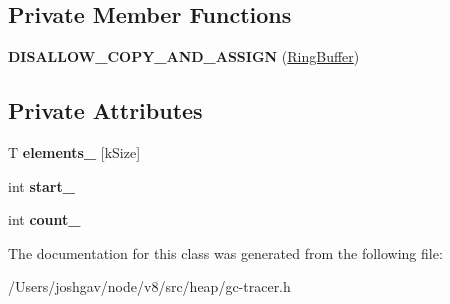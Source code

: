 \subsection*{Private Member Functions}
\begin{DoxyCompactItemize}
\item 
{\bfseries D\+I\+S\+A\+L\+L\+O\+W\+\_\+\+C\+O\+P\+Y\+\_\+\+A\+N\+D\+\_\+\+A\+S\+S\+I\+GN} (\hyperlink{classv8_1_1internal_1_1_ring_buffer}{Ring\+Buffer})\hypertarget{classv8_1_1internal_1_1_ring_buffer_a89f1cecc23cc705f1743560e77be6b63}{}\label{classv8_1_1internal_1_1_ring_buffer_a89f1cecc23cc705f1743560e77be6b63}

\end{DoxyCompactItemize}
\subsection*{Private Attributes}
\begin{DoxyCompactItemize}
\item 
T {\bfseries elements\+\_\+} \mbox{[}k\+Size\mbox{]}\hypertarget{classv8_1_1internal_1_1_ring_buffer_ab2dc899cccf662dd775dd2a7cba34a71}{}\label{classv8_1_1internal_1_1_ring_buffer_ab2dc899cccf662dd775dd2a7cba34a71}

\item 
int {\bfseries start\+\_\+}\hypertarget{classv8_1_1internal_1_1_ring_buffer_a225cf4c0ccc7627a38c0e0403b0dd164}{}\label{classv8_1_1internal_1_1_ring_buffer_a225cf4c0ccc7627a38c0e0403b0dd164}

\item 
int {\bfseries count\+\_\+}\hypertarget{classv8_1_1internal_1_1_ring_buffer_a5fdc3af1d425822a5c3480b421b2825d}{}\label{classv8_1_1internal_1_1_ring_buffer_a5fdc3af1d425822a5c3480b421b2825d}

\end{DoxyCompactItemize}


The documentation for this class was generated from the following file\+:\begin{DoxyCompactItemize}
\item 
/\+Users/joshgav/node/v8/src/heap/gc-\/tracer.\+h\end{DoxyCompactItemize}
